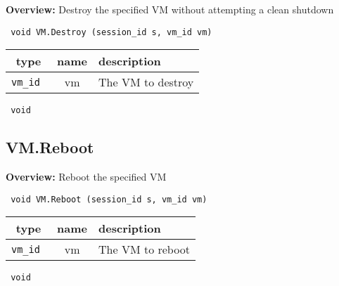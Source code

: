 {\bf Overview:} 
Destroy the specified VM without attempting a clean shutdown

\begin{verbatim} void VM.Destroy (session_id s, vm_id vm)\end{verbatim}



 
\vspace{0.3cm}
\begin{tabular}{|c|c|p{7cm}|}
 \hline
{\bf type} & {\bf name} & {\bf description} \\ \hline
{\tt vm\_id } & vm & The VM to destroy \\ \hline 

\end{tabular}

\vspace{0.3cm}

{\tt 
void
}



\vspace{0.3cm}
\vspace{0.3cm}
\vspace{0.3cm}

\subsection{VM.Reboot}

{\bf Overview:} 
Reboot the specified VM

\begin{verbatim} void VM.Reboot (session_id s, vm_id vm)\end{verbatim}



 
\vspace{0.3cm}
\begin{tabular}{|c|c|p{7cm}|}
 \hline
{\bf type} & {\bf name} & {\bf description} \\ \hline
{\tt vm\_id } & vm & The VM to reboot \\ \hline 

\end{tabular}

\vspace{0.3cm}

{\tt 
void
}



\vspace{0.3cm}
\vspace{0.3cm}
\vspace{0.3cm}

